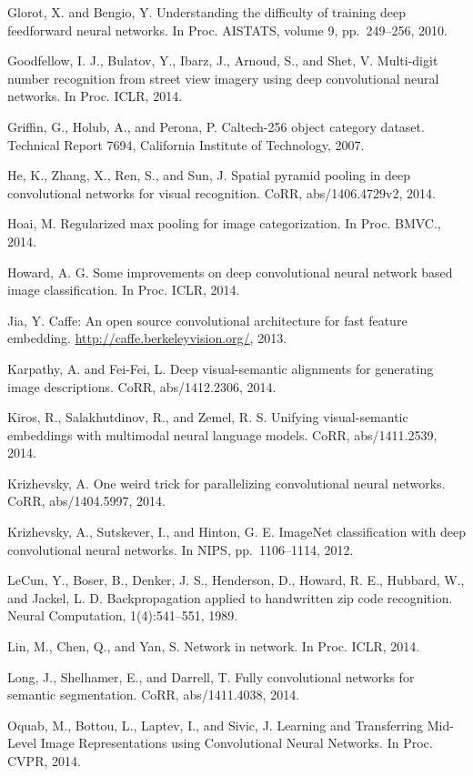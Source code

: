 \documentclass[12pt,a4paper,UTF8,twoside]{book}
\begin{document}
Glorot, X. and Bengio, Y. Understanding the difficulty of training deep feedforward neural networks. In Proc. AISTATS, volume 9, pp.~249--256, 2010.

Goodfellow, I. J., Bulatov, Y., Ibarz, J., Arnoud, S., and Shet, V. Multi-digit number recognition from street view imagery using deep convolutional neural networks. In Proc. ICLR, 2014.

Griffin, G., Holub, A., and Perona, P. Caltech-256 object category dataset. Technical Report 7694, California Institute of Technology, 2007.

He, K., Zhang, X., Ren, S., and Sun, J. Spatial pyramid pooling in deep convolutional networks for visual recognition. CoRR, abs/1406.4729v2, 2014.

Hoai, M. Regularized max pooling for image categorization. In Proc. BMVC., 2014.

Howard, A. G. Some improvements on deep convolutional neural network based image classification. In Proc. ICLR, 2014.

Jia, Y. Caffe: An open source convolutional architecture for fast feature embedding. \url{http://caffe.berkeleyvision.org/}, 2013.

Karpathy, A. and Fei-Fei, L. Deep visual-semantic alignments for generating image descriptions. CoRR, abs/1412.2306, 2014.

Kiros, R., Salakhutdinov, R., and Zemel, R. S. Unifying visual-semantic embeddings with multimodal neural language models. CoRR, abs/1411.2539, 2014.

Krizhevsky, A. One weird trick for parallelizing convolutional neural networks. CoRR, abs/1404.5997, 2014.

Krizhevsky, A., Sutskever, I., and Hinton, G. E. ImageNet classification with deep convolutional neural networks. In NIPS, pp.~1106--1114, 2012.

LeCun, Y., Boser, B., Denker, J. S., Henderson, D., Howard, R. E., Hubbard, W., and Jackel, L. D. Backpropagation applied to handwritten zip code recognition. Neural Computation, 1(4):541--551, 1989.

Lin, M., Chen, Q., and Yan, S. Network in network. In Proc. ICLR, 2014.

Long, J., Shelhamer, E., and Darrell, T. Fully convolutional networks for semantic segmentation. CoRR, abs/1411.4038, 2014.

Oquab, M., Bottou, L., Laptev, I., and Sivic, J. Learning and Transferring Mid-Level Image Representations using Convolutional Neural Networks. In Proc. CVPR, 2014.
\end{document}
